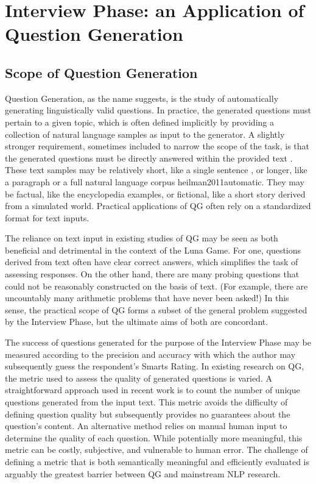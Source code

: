 \section{Interview Phase: an Application of Question Generation}

\subsection{Scope of Question Generation}

Question Generation, as the name suggests, is the study of automatically generating linguistically valid questions. In practice, the generated questions must pertain to a given topic, which is often defined implicitly by providing a collection of natural language samples as input to the generator. A slightly stronger requirement, sometimes included to narrow the scope of the task, is that the generated questions must be directly answered within the provided text \cite{rus2011question, heilman2011automatic} . These text samples may be relatively short, like a single sentence \cite{ali2010automatic, rus2011question}, or longer, like a paragraph \cite{mannem2010question} or a full natural language corpus {heilman2011automatic}. They may be factual, like the encyclopedia examples, or fictional, like a short story derived from a simulated world. Practical applications of QG often rely on a standardized format for text inputs. 

The reliance on text input in existing studies of QG may be seen as both beneficial and detrimental in the context of the Luna Game. For one, questions derived from text often have clear correct answers, which simplifies the task of assessing responses. On the other hand, there are many probing questions that could not be reasonably constructed on the basis of text. (For example, there are uncountably many arithmetic problems that have never been asked!) In this sense, the practical scope of QG forms a subset of the general problem suggested by the Interview Phase, but the ultimate aims of both are concordant. 

The success of questions generated for the purpose of the Interview Phase may be measured according to the precision and accuracy with which the author may subsequently guess the respondent's Smarts Rating. In existing research on QG, the metric used to assess the quality of generated questions is varied. A straightforward approach used in recent work is to count the number of unique questions generated from the input text. This metric avoids the difficulty of defining question quality but subsequently provides no guarantees about the question's content. An alternative method relies on manual human input to determine the quality of each question. While potentially more meaningful, this metric can be costly, subjective, and vulnerable to human error. The challenge of defining a metric that is both semantically meaningful and efficiently evaluated is arguably the greatest barrier between QG and mainstream NLP research.

